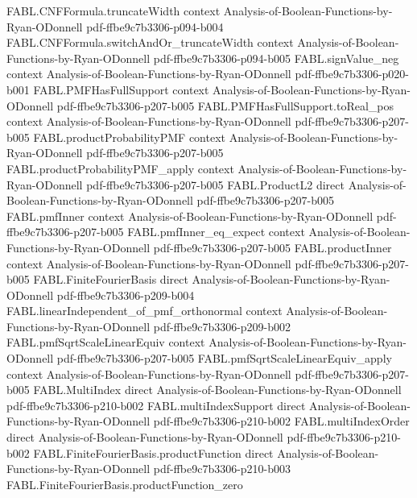 \begin{theorem}
  {FABL.CNFFormula.truncateWidth}
  {context}
  {Analysis-of-Boolean-Functions-by-Ryan-ODonnell}
  {pdf-ffbe9c7b3306-p094-b004}
\proofstep
  {FABL.CNFFormula.switchAndOr_truncateWidth}
  {context}
  {Analysis-of-Boolean-Functions-by-Ryan-ODonnell}
  {pdf-ffbe9c7b3306-p094-b005}
\proofstep
  {FABL.signValue_neg}
  {context}
  {Analysis-of-Boolean-Functions-by-Ryan-ODonnell}
  {pdf-ffbe9c7b3306-p020-b001}
\proofstep
  {FABL.PMFHasFullSupport}
  {context}
  {Analysis-of-Boolean-Functions-by-Ryan-ODonnell}
  {pdf-ffbe9c7b3306-p207-b005}
\proofstep
  {FABL.PMFHasFullSupport.toReal_pos}
  {context}
  {Analysis-of-Boolean-Functions-by-Ryan-ODonnell}
  {pdf-ffbe9c7b3306-p207-b005}
\proofstep
  {FABL.productProbabilityPMF}
  {context}
  {Analysis-of-Boolean-Functions-by-Ryan-ODonnell}
  {pdf-ffbe9c7b3306-p207-b005}
\proofstep
  {FABL.productProbabilityPMF_apply}
  {context}
  {Analysis-of-Boolean-Functions-by-Ryan-ODonnell}
  {pdf-ffbe9c7b3306-p207-b005}
\proofstep
  {FABL.ProductL2}
  {direct}
  {Analysis-of-Boolean-Functions-by-Ryan-ODonnell}
  {pdf-ffbe9c7b3306-p207-b005}
\proofstep
  {FABL.pmfInner}
  {context}
  {Analysis-of-Boolean-Functions-by-Ryan-ODonnell}
  {pdf-ffbe9c7b3306-p207-b005}
\proofstep
  {FABL.pmfInner_eq_expect}
  {context}
  {Analysis-of-Boolean-Functions-by-Ryan-ODonnell}
  {pdf-ffbe9c7b3306-p207-b005}
\proofstep
  {FABL.productInner}
  {context}
  {Analysis-of-Boolean-Functions-by-Ryan-ODonnell}
  {pdf-ffbe9c7b3306-p207-b005}
\proofstep
  {FABL.FiniteFourierBasis}
  {direct}
  {Analysis-of-Boolean-Functions-by-Ryan-ODonnell}
  {pdf-ffbe9c7b3306-p209-b004}
\proofstep
  {FABL.linearIndependent_of_pmf_orthonormal}
  {context}
  {Analysis-of-Boolean-Functions-by-Ryan-ODonnell}
  {pdf-ffbe9c7b3306-p209-b002}
\proofstep
  {FABL.pmfSqrtScaleLinearEquiv}
  {context}
  {Analysis-of-Boolean-Functions-by-Ryan-ODonnell}
  {pdf-ffbe9c7b3306-p207-b005}
\proofstep
  {FABL.pmfSqrtScaleLinearEquiv_apply}
  {context}
  {Analysis-of-Boolean-Functions-by-Ryan-ODonnell}
  {pdf-ffbe9c7b3306-p207-b005}
\proofstep
  {FABL.MultiIndex}
  {direct}
  {Analysis-of-Boolean-Functions-by-Ryan-ODonnell}
  {pdf-ffbe9c7b3306-p210-b002}
\proofstep
  {FABL.multiIndexSupport}
  {direct}
  {Analysis-of-Boolean-Functions-by-Ryan-ODonnell}
  {pdf-ffbe9c7b3306-p210-b002}
\proofstep
  {FABL.multiIndexOrder}
  {direct}
  {Analysis-of-Boolean-Functions-by-Ryan-ODonnell}
  {pdf-ffbe9c7b3306-p210-b002}
\proofstep
  {FABL.FiniteFourierBasis.productFunction}
  {direct}
  {Analysis-of-Boolean-Functions-by-Ryan-ODonnell}
  {pdf-ffbe9c7b3306-p210-b003}
\proofstep
  {FABL.FiniteFourierBasis.productFunction_zero}

\end{theorem}
